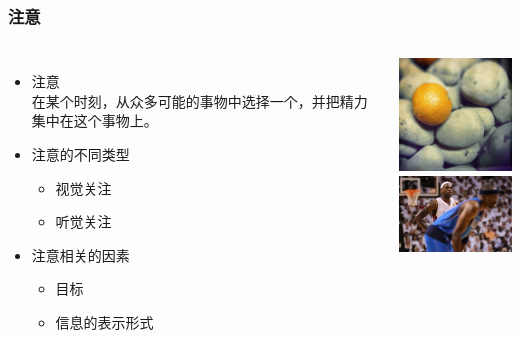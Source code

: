 \documentclass{beamer}
\begin{document}
{
\frame[plain]{\transdissolve}
}

\begin{frame}
	\frametitle{注意}
	\transdissolve
	\begin{columns}
		\column{5cm}
		\begin{itemize}
			\item 注意\\{\tiny 在某个时刻，从众多可能的事物中选择一个，并把精力集中在这个事物上。} 
			\item 注意的不同类型
			\begin{itemize}
				\item 视觉关注
				\item 听觉关注
			\end{itemize}		
			\item 注意相关的因素
			\begin{itemize}
				\item 目标
				\item 信息的表示形式
			\end{itemize}		
		\end{itemize}
		\column{5cm}
		\includegraphics[width=4cm]{images/focus1.jpg}\\
		\includegraphics[width=4cm]{images/focus2.jpg}
	\end{columns}
\end{frame}
\end{document}
